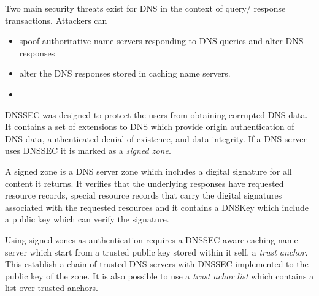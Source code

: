 \documentclass[Preamble]{subfiles}
\begin{document}
Two main security threats exist for DNS in the context of query/
response transactions. Attackers can

	\begin{itemize}%
	\item spoof authoritative name servers responding to DNS queries and alter DNS responses

	\item alter the DNS responses stored in caching name servers.
	\item[] \hspace{100mm}\cite[p. 84]{DNS-article}
	\end{itemize} 
DNSSEC was designed to protect the users from obtaining corrupted DNS data. 
It contains a set of extensions to DNS which provide origin authentication of DNS data, authenticated denial of existence, and data integrity.
If a DNS server uses DNSSEC it is marked as a \textit{signed zone}.



A signed zone is a DNS server zone which includes a digital signature for all content it returns.
It verifies that the underlying responses have requested resource records, special resource records that carry the digital signatures associated with the requested resources and it contains a DNSKey which include a public key which can verify the signature.



Using signed zones as authentication requires a DNSSEC-aware caching name server which start from a trusted public key stored within it self, a \textit{trust anchor}.
This establish a chain of trusted DNS servers with DNSSEC implemented to the public key of the zone. 
It is also possible to use a \textit{trust achor list} which contains a list over trusted anchors.
\end{document}
